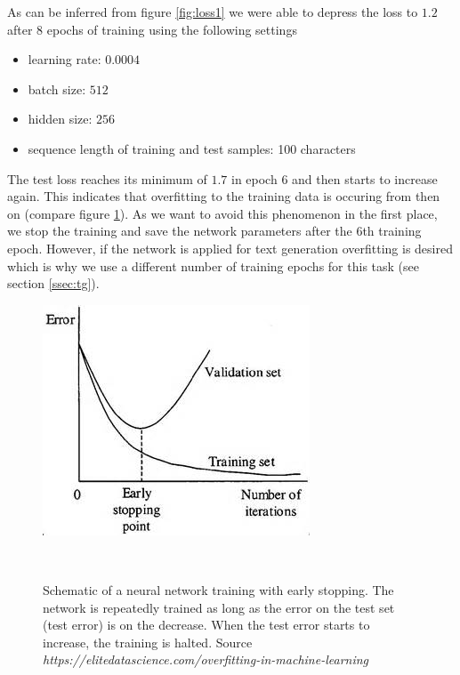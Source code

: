 \documentclass[11pt,a4paper,bibliography=totocnumbered,listof=totocnumbered]{scrartcl}
\begin{document}
As can be inferred from figure \ref{fig:loss1} we were able to depress the loss to $1.2$ after $8$ epochs of training using the following settings
\begin{itemize}
	\item learning rate: $0.0004$
	\item batch size: $512$
	\item hidden size: $256$
	\item sequence length of training and test samples: 100 characters
\end{itemize}
The test loss reaches its minimum of $1.7$ in epoch $6$ and then starts to increase again. This indicates that overfitting to the training data is occuring from then on (compare figure \ref{fig:stop}). As we want to avoid this phenomenon in the first place, we stop the training and save the network parameters after the $6$th training epoch. However, if the network is applied for text generation overfitting is desired which is why we use a different number of training epochs for this task (see section \ref{ssec:tg}).

\begin{figure}[H]
   \begin{minipage}{\textwidth}
     \centering
     \includegraphics[width=.4\textwidth]{early-stopping-graphic}
     \caption{Schematic of a neural network training with early stopping. The network is repeatedly trained as long as the error on the test set (test error) is on the decrease. When the test error starts to increase, the training is halted. Source \textit{https://elitedatascience.com/overfitting-in-machine-learning}}
     \label{fig:stop}
   \end{minipage}\\[1em]   
\end{figure}
\end{document}
